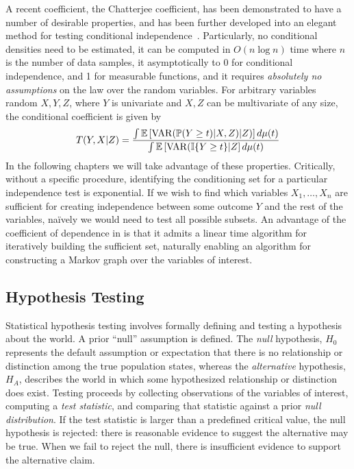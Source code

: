 A recent coefficient, the Chatterjee coefficient, has been demonstrated to have a number of desirable properties, and has been further developed into an elegant method for testing conditional independence~\citep{abc,abc}. 
Particularly,
no conditional densities need to be estimated,
it can be computed in $O(n\log n)$ time where $n$ is the number of data samples,
it asymptotically to 0 for conditional independence, and 1 for measurable functions,
and it requires \textit{absolutely no assumptions} on the law over the random variables.
For arbitrary variables random $X,Y,Z$, where $Y$ is univariate and $X,Z$ can be multivariate of any size, the conditional coefficient is given  by
\begin{align}\label{eq:contcodec}
    T(Y,X|Z) = \frac{\int\mathbb{E}\left[\operatorname*{VAR}(\mathbb{P}(Y\geq t)|X,Z)|Z)\right]d\mu(t)}{\int\mathbb{E}\left[\operatorname*{VAR}(\mathbb{I}\{Y\geq t\}|Z\right] d\mu(t)}
\end{align}
In the following chapters we will take advantage of these properties. Critically, without a specific procedure, identifying the conditioning set for a particular independence test is exponential. If we wish to find which variables $X_1,\ldots,X_n$ are sufficient for creating independence between some outcome $Y$ and the rest of the variables, na\"ively we would need to test all possible subsets.
An advantage of the coefficient of dependence in \cite{abc} is that it admits a linear time algorithm for iteratively building the sufficient set, naturally enabling an algorithm for constructing a Markov graph over the variables of interest.

\subsection{Hypothesis Testing}

Statistical hypothesis testing involves formally defining and testing a hypothesis about the world.
A prior ``null'' assumption is defined. The \textit{null} hypothesis, $H_0$
represents the default assumption or expectation
that there is no relationship or distinction among
the true population states,
whereas the \textit{alternative} hypothesis, $H_A$,
describes the world in which some hypothesized 
relationship or distinction does exist.
Testing proceeds by collecting observations
of the variables of interest,
computing a \textit{test statistic},
and comparing that statistic against
a prior \textit{null distribution}.
If the test statistic is larger
than a predefined critical value,
the null hypothesis is rejected:
there is reasonable evidence to suggest
the alternative may be true.
When we fail to reject the null,
there is insufficient evidence to support
the alternative claim.

